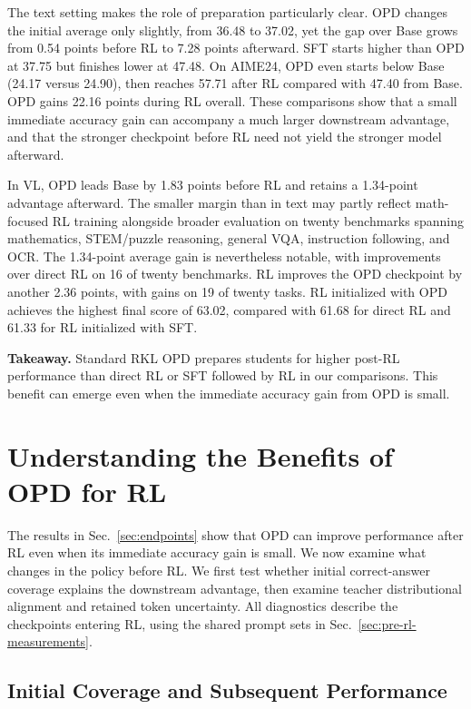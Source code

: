 \documentclass[]{jingdong}
\theoremstyle{plain}
\theoremstyle{definition}
\theoremstyle{remark}
\begin{document}
The text setting makes the role of preparation particularly clear. OPD changes the initial average only slightly, from 36.48 to 37.02, yet the gap over Base grows from 0.54 points before RL to 7.28 points afterward. SFT starts higher than OPD at 37.75 but finishes lower at 47.48. On AIME24, OPD even starts below Base (24.17 versus 24.90), then reaches 57.71 after RL compared with 47.40 from Base. OPD gains 22.16 points during RL overall. These comparisons show that a small immediate accuracy gain can accompany a much larger downstream advantage, and that the stronger checkpoint before RL need not yield the stronger model afterward.

In VL, OPD leads Base by 1.83 points before RL and retains a 1.34-point advantage afterward. The smaller margin than in text may partly reflect math-focused RL training alongside broader evaluation on twenty benchmarks spanning mathematics, STEM/puzzle reasoning, general VQA, instruction following, and OCR. The 1.34-point average gain is nevertheless notable, with improvements over direct RL on 16 of twenty benchmarks. RL improves the OPD checkpoint by another 2.36 points, with gains on 19 of twenty tasks. RL initialized with OPD achieves the highest final score of 63.02, compared with 61.68 for direct RL and 61.33 for RL initialized with SFT.

\begin{takeaway}
\textbf{Takeaway.} Standard RKL OPD prepares students for higher post-RL performance than direct RL or SFT followed by RL in our comparisons. This benefit can emerge even when the immediate accuracy gain from OPD is small.
\end{takeaway}

\section{Understanding the Benefits of OPD for RL}
\label{sec:support}

The results in Sec.~\ref{sec:endpoints} show that OPD can improve performance after RL even when its immediate accuracy gain is small. We now examine what changes in the policy before RL. We first test whether initial correct-answer coverage explains the downstream advantage, then examine teacher distributional alignment and retained token uncertainty. All diagnostics describe the checkpoints entering RL, using the shared prompt sets in Sec.~\ref{sec:pre-rl-measurements}.

\subsection{Initial Coverage and Subsequent Performance}
\label{sec:initial-coverage}
\end{document}
